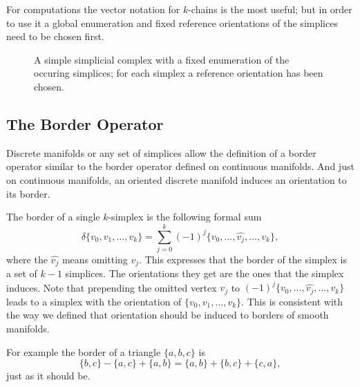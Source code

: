 For computations the vector notation for $k$-chains is the most useful; but in order to use it a global enumeration and fixed reference orientations of the simplices need to be chosen first.

\begin{figure}%

\begin{center}
\def\svgwidth{13cm}

\end{center}
\vspace{-0.5cm}

\caption{A simple simplicial complex with a fixed enumeration of the occuring simplices; for each simplex a reference orientation has been chosen.}%
\label{fig::2_2_complexenum}%
\end{figure}

\subsection{The Border Operator}
\label{sec::2_borderOrientation}
Discrete manifolds or any set of simplices allow the definition of a border operator similar to the border operator defined on continuous manifolds. And just on continuous manifolds, an oriented discrete manifold induces an orientation to its border.


The border of a single $k$-simplex is  the following formal sum
\[\delta\{v_0,v_1,...,v_k\} = \sum_{j=0}^k (-1)^j\{v_0,...,\widehat{v_j},...,v_k\},\]
where  the $\widehat{v_j}$ means omitting $v_j$. This expresses that the border of the simplex is a set of $k-1$ simplices. The orientations they get are the ones that the simplex induces. Note that prepending the omitted vertex $v_j$ to $(-1)^j\{v_0,...,\widehat{v_j},...,v_k\}$ leads to a simplex with the orientation of $\{v_0,v_1,...,v_k\}$. This is consistent with the way we defined that orientation should be induced to borders of smooth manifolds. 

For example the border of a triangle $\{a,b,c\}$ is \[\{b,c\} -\{a,c\} + \{a,b\} = \{a,b\} + \{b,c\} + \{c,a\},\] just as it should be.

